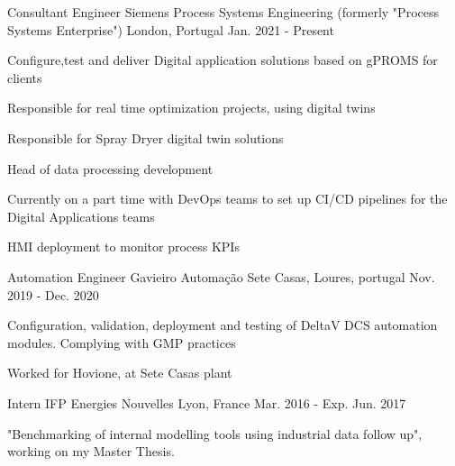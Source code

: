 

\begin{cventries}

  \cventry
    {Consultant Engineer} %
    {Siemens Process Systems Engineering (formerly "Process Systems Enterprise")} %
    {London, Portugal} %
    {Jan. 2021 - Present} %
    {
      \begin{cvitems} %
        \item {Configure,test and deliver Digital application solutions based on gPROMS for clients}
        \item {Responsible for real time optimization projects, using digital twins}
        \item {Responsible for Spray Dryer digital twin solutions}
        \item {Head of data processing development}
        \item {Currently on a part time with DevOps teams to set up CI/CD pipelines for the Digital Applications teams}
        \item {HMI deployment to monitor process KPIs}
      \end{cvitems}
    }

  \cventry
    {Automation Engineer} %
    {Gavieiro Automação} %
    {Sete Casas, Loures, portugal} %
    {Nov. 2019 - Dec. 2020} %
    {
      \begin{cvitems} %
        \item {Configuration, validation, deployment and testing of DeltaV DCS automation modules. Complying with GMP practices}
        \item {Worked for Hovione, at Sete Casas plant}
      \end{cvitems}
    }

  \cventry
    {Intern} %
    {IFP Energies Nouvelles} %
    {Lyon, France} %
    {Mar. 2016 - Exp. Jun. 2017} %
    {
      \begin{cvitems} %
        \item {"Benchmarking of internal modelling tools using industrial data follow up", working on my Master Thesis.}
      \end{cvitems}
    }


\end{cventries}
